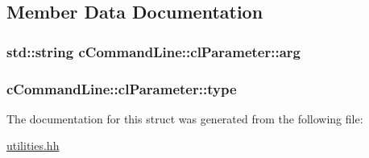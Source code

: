 \subsection{Member Data Documentation}
\hypertarget{structcCommandLine_1_1clParameter_afb1f7ab3f77c4a762e3bf342cc6b84df}{
\subsubsection[{arg}]{\setlength{\rightskip}{0pt plus 5cm}std\-::string c\-Command\-Line\-::cl\-Parameter\-::arg}}\label{structcCommandLine_1_1clParameter_afb1f7ab3f77c4a762e3bf342cc6b84df}
\hypertarget{structcCommandLine_1_1clParameter_ad9a8e723680dd3e29f74e62f940968fe}{
\subsubsection[{type}]{ c\-Command\-Line\-::cl\-Parameter\-::type}}\label{structcCommandLine_1_1clParameter_ad9a8e723680dd3e29f74e62f940968fe}


The documentation for this struct was generated from the following file\-:\begin{DoxyCompactItemize}
\item 
\hyperlink{utilities_8hh}{utilities.\-hh}\end{DoxyCompactItemize}
